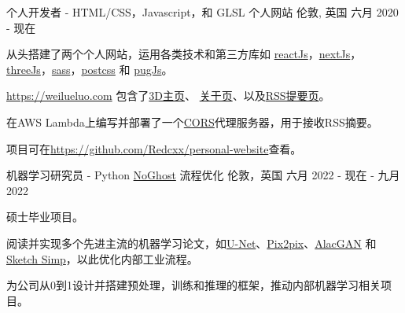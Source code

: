 

\begin{cventries}

  \cventry
    {个人开发者 - HTML/CSS，Javascript，和 GLSL} %
    {个人网站} %
    {伦敦, 英国} %
    {六月 2020 - 现在} %
    {
      \begin{cvitems} %
        \item {从头搭建了两个个人网站，运用各类技术和第三方库如 \href{https://reactjs.org/}{reactJs}，\href{https://nextjs.org/}{nextJs}，\href{https://threejs.org/}{threeJs}，\href{https://sass-lang.com/}{sass}，\href{https://postcss.org/}{postcss} 和 \href{https://pugjs.org/api/getting-started.html}{pugJs}。}
        \item {\href{https://weilueluo.com}{https://weilueluo.com} 包含了\href{https://weilueluo.com}{3D主页}、 \href{https://weilueluo.com/about.html}{关于页}、以及\href{https://weilueluo.com/rss.html}{RSS提要页}。}
        \item {在AWS Lambda上编写并部署了一个\href{https://developer.mozilla.org/en-US/docs/Web/HTTP/CORS}{CORS}代理服务器，用于接收RSS摘要。}
        \item {项目可在\href{https://github.com/Redcxx/personal-website}{https://github.com/Redcxx/personal-website}查看。}
      \end{cvitems}
    }

  \cventry
    {机器学习研究员 - Python} %
    {\href{https://www.noghost.co.uk/}{NoGhost} 流程优化} %
    {伦敦，英国} %
    {六月 2022 - 现在 - 九月 2022} %
    {
      \begin{cvitems} %
        \item {硕士毕业项目。}
        \item {阅读并实现多个先进主流的机器学习论文，如\href{https://arxiv.org/abs/1505.04597}{U-Net}、\href{https://arxiv.org/pdf/1611.07004.pdf}{Pix2pix}、\href{https://arxiv.org/abs/1808.03240}{AlacGAN} 和 \href{https://esslab.jp/~ess/en/research/sketch/}{Sketch Simp}，以此优化内部工业流程。}
        \item {为公司从0到1设计并搭建预处理，训练和推理的框架，推动内部机器学习相关项目。}
      \end{cvitems}
    }



\end{cventries}
